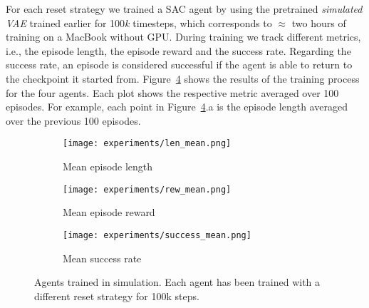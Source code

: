 For each reset strategy we trained a SAC agent by using the pretrained \textit{simulated VAE} trained earlier for 100\textit{k} timesteps, which corresponds to $\approx$ two hours of training on a MacBook without GPU. During training we track different metrics, i.e., the episode length, the episode reward and the success rate. Regarding the success rate, an episode is considered successful if the agent is able to return to the checkpoint it started from. Figure~\ref{fig:agentresults} shows the results of the training process for the four agents. Each plot shows the respective metric averaged over 100 episodes. For example, each point in Figure~\ref{fig:agentresults}.a is the episode length averaged over the previous 100 episodes. 


\begin{figure}[h]
  \centering
  \begin{subfigure}{.45\linewidth}
      \centering
      \texttt{[image: experiments/len\_mean.png]}
      \caption{Mean episode length}\label{fig:len}
  \end{subfigure}%
      \hfill
  \begin{subfigure}{.45\linewidth}
      \centering
      \texttt{[image: experiments/rew\_mean.png]}
      \caption{Mean episode reward}\label{fig:rew}
  \end{subfigure}
  
  \bigskip
  \begin{subfigure}{.45\linewidth}
    \centering
    \texttt{[image: experiments/success\_mean.png]}
    \caption{Mean success rate}\label{fig:succ}
  \end{subfigure} 
  \caption{Agents trained in simulation. Each agent has been trained with a different reset strategy for 100k steps.}
  \label{fig:agentresults}
\end{figure}

